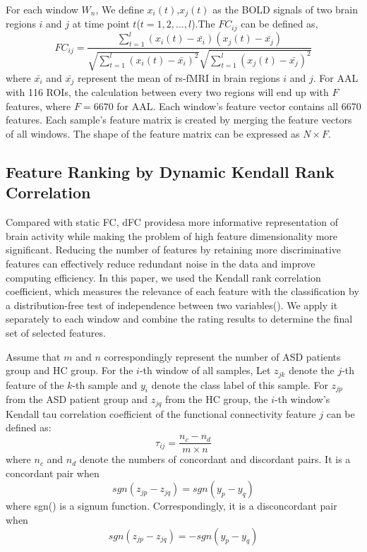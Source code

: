 \documentclass[a4paper]{cas-dc}
\begin{document}
For each window $W_n$, We define $x_{i}(t)$,$x_{j}(t)$ as the BOLD signals of two brain regions $i$ and $j$ at time point $t$($t = 1,2,...,l$).The $FC_{ij}$ can be defined as,
\begin{equation}
	FC_{ij}=\frac{\sum_{t=1}^{l}(x_{i}(t)-\bar{x_{i}})(x_{j}(t)-\bar{x_{j}})}{\sqrt{\sum_{t=1}^{l}(x_{i}(t)-\bar{x_{i}})^2}\sqrt{\sum_{t=1}^{l}(x_{j}(t)-\bar{x_{j}})^2}}
\end{equation}
where $\bar{x_{i}}$ and $\bar{x_{j}}$ represent the mean of rs-fMRI in brain regions $i$ and $j$. For AAL with 116 ROIs, the calculation between every two regions will end up with $F$ features, where $F=6670$ for AAL. Each window's feature vector contains all 6670 features. Each sample's feature matrix is created by merging the feature vectors of all windows. The shape of the feature matrix can be expressed as $N\times F$.
\subsection{Feature Ranking by Dynamic Kendall Rank Correlation}
Compared with static FC, dFC providesa more informative representation of brain activity while making the problem of high feature dimensionality more significant. Reducing the number of features by retaining more discriminative features can effectively reduce redundant noise in the data and improve computing efficiency. In this paper, we used the Kendall rank correlation coefficient, which measures the relevance of each feature with the classification by a distribution-free test of independence between two variables(\cite{zeng2012identifying}). We apply it separately to each window and combine the rating results to determine the final set of selected features. 

Assume that $m$ and $n$ correspondingly represent the number of ASD patients group and HC group. For the $i$-th window of all samples, Let $z_{jk}$ denote the $j$-th feature of the $k$-th sample and $y_i$ denote the class label of this sample. For $z_{jp}$ from the ASD patient group and $z_{jq}$ from the HC group, the $i$-th window's Kendall tau correlation coefficient of the functional connectivity feature $j$ can be defined as:
\begin{equation}
	\tau_{ij} = \frac{n_c - n_d}{m \times n}
\end{equation}
where $n_c$ and $n_d$ denote the numbers of concordant and discordant pairs. It is a concordant pair when
\begin{equation}
	sgn(z_{jp} - z_{jq}) = sgn(y_p-y_q)
\end{equation}
where sgn() is a signum function. Correspondingly, it is a disconcordant pair when
\begin{equation}
	sgn(z_{jp} - z_{jq}) = -sgn(y_p-y_q)
\end{equation}
\end{document}
